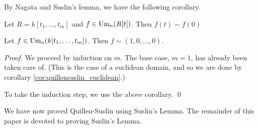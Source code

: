 By Nagata and Suslin's lemma, we have the following corollary.

\begin{corollary}\label{cor:suslinscorollary}
  Let $R = k[t_1, \dots, t_m]$ and $f \in \text{Um}_n(R[t])$.
  Then $f(t) \sim f(0)$
\end{corollary}

\begin{theorem}
  Let $f \in \text{Um}_n(k[t_1, \dots, t_m])$. Then $f \sim (1,0,\dots,0)$.
\end{theorem}
\begin{proof}
  We proceed by induction on $m$.
  The base case, $m=1$, has already been taken care of.
  (This is the case of a euclidean domain, and so we are done by corollary \ref{cor:quillensuslin_euclidean}.)

  To take the induction step, we use the above corollary.
  \qed
\end{proof}

We have now proved Quillen-Suslin using Suslin's Lemma.
The remainder of this paper is devoted to proving Suslin's Lemma.
